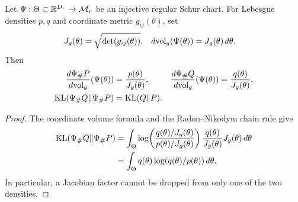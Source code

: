 \begin{proposition}
\label{prop:rigid-volume-cancellation}
Let $\Psi:\Theta\subset\mathbb R^{D_r}\to\mathcal M_r$ be an injective regular
Schur chart. For Lebesgue densities $p,q$ and coordinate metric
$g_{ij}(\theta)$, set
\begin{align}
J_g(\theta)&=\sqrt{\det(g_{ij}(\theta))},&
d{\rm vol}_g(\Psi(\theta))&=J_g(\theta)\,d\theta .
\end{align}
Then
\begin{align}
\frac{d\Psi_\#P}{d{\rm vol}_g}(\Psi(\theta))
&=\frac{p(\theta)}{J_g(\theta)},&
\frac{d\Psi_\#Q}{d{\rm vol}_g}(\Psi(\theta))
&=\frac{q(\theta)}{J_g(\theta)},\\
{\rm KL}(\Psi_\#Q\|\Psi_\#P)&={\rm KL}(Q\|P).
\label{eq:rigid-volume-cancellation}
\end{align}
\end{proposition}
\begin{proof}
The coordinate volume formula and the Radon--Nikodym chain rule give
\begin{align}
{\rm KL}(\Psi_\#Q\|\Psi_\#P)
&=\int_\Theta
\log\!\left(\frac{q(\theta)/J_g(\theta)}
{p(\theta)/J_g(\theta)}\right)
\frac{q(\theta)}{J_g(\theta)}J_g(\theta)\,d\theta\\
&=\int_\Theta q(\theta)\log(q(\theta)/p(\theta))\,d\theta .
\end{align}
In particular, a Jacobian factor cannot be dropped from only one of
the two densities.
\end{proof}

